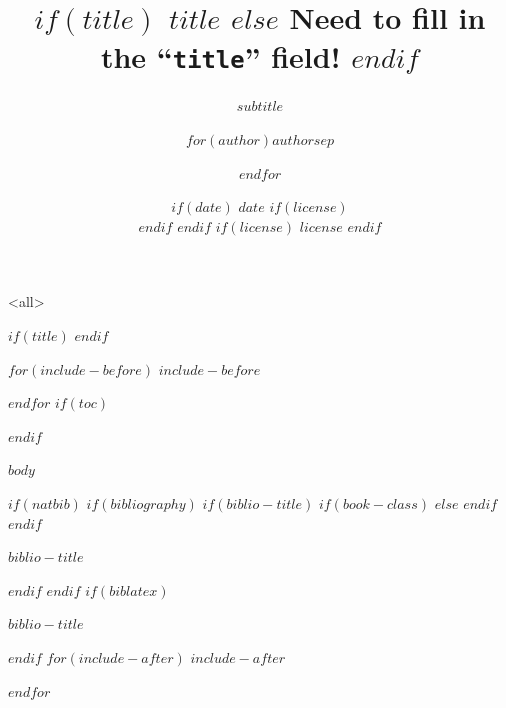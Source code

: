 \documentclass[$if(fontsize)$$fontsize$,$endif$$if(lang)$$babel-lang$,$endif$$if(handout)$handout,$endif$$if(beamer)$ignorenonframetext,$endif$$for(classoption)$$classoption$$sep$,$endfor$]{$documentclass$}
\subtitle{$subtitle$}
\author[
$if(short-author)$
$for(short-author)$$short-author$$sep$ \and $endfor$
$else$
$for(author)$$author$$sep$ \and $endfor$
$endif$
]{$for(author)$$author$$sep$ \and $endfor$}
\institute[
$if(short-institute)$
$for(short-institute)$$short-institute$$sep$ \and $endfor$
$endif$
]{
$if(department)$
$for(department)$$department$$sep$ \and $endfor$ \\
$endif$
$for(institute)$$institute$$sep$ \and $endfor$
$if(email)$
\\ $for(email)$ \href{mailto:$email$}{\nolinkurl{$email$}}$sep$ \and $endfor$
$endif$
}
\date[
$if(short-date)$
$short-date$
$else$
$date$
$endif$]{
$if(date)$
$date$
$if(license)$
\\ \vspace{5mm}
$endif$
$endif$
$if(license)$
{\scriptsize $license$}
$endif$
}
\newif\ifbibliography
\begin{document}
\mode<all>{
\title[
$if(short-title)$
$short-title$
$else$
Missing ``\texttt{short-title}'' field!
$endif$
]{
$if(title)$
$title$
$else$
Need to fill in the ``\texttt{title}'' field!
$endif$
}
}
\mode*

$if(title)$
\frame[plain]{\titlepage}
$endif$

$for(include-before)$
$include-before$

$endfor$
$if(toc)$
\begin{frame}
\tableofcontents[hideallsubsections]
\end{frame}
$endif$

$body$

$if(natbib)$
$if(bibliography)$
$if(biblio-title)$
$if(book-class)$
\renewcommand\bibname{$biblio-title$}
$else$
\renewcommand\refname{$biblio-title$}
$endif$
$endif$
\begin{frame}[allowframebreaks]{$biblio-title$}
\bibliographytrue

\end{frame}

$endif$
$endif$
$if(biblatex)$
\begin{frame}[allowframebreaks]{$biblio-title$}
\bibliographytrue
\printbibliography[heading=none]
\end{frame}

$endif$
$for(include-after)$
$include-after$

$endfor$
\end{document}

